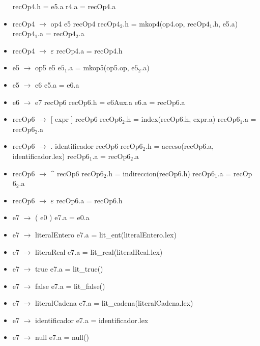 \documentclass[11pt]{article}
\begin{document}
\begin{itemize}
                \subitem recOp4.h = e5.a
                \subitem r4.a = recOp4.a
            \item recOp4 $\rightarrow$ op4 e5 recOp4
                \subitem recOp$4_2$.h = mkop4(op4.op, recOp$4_1$.h, e5.a)
                \subitem recOp$4_1$.a = recOp$4_2$.a
            \item recOp4 $\rightarrow$ $\varepsilon$
                \subitem recOp4.a = recOp4.h
            \item e5 $\rightarrow$ op5 e5
                \subitem e$5_1$.a = mkop5(op5.op, e$5_2$.a)
            \item e5 $\rightarrow$ e6
                \subitem e5.a = e6.a
            \item e6 $\rightarrow$ e7 recOp6
                \subitem recOp6.h = e6Aux.a
                \subitem e6.a = recOp6.a
            \item recOp6 $\rightarrow$ [ expr ] recOp6
                \subitem recOp$6_2$.h = index(recOp6.h, expr.a)
                \subitem recOp$6_1$.a = recOp$6_2$.a
            \item recOp6 $\rightarrow$ . identificador recOp6
                \subitem recOp$6_2$.h = acceso(recOp6.a, identificador.lex)
                \subitem recOp$6_1$.a = recOp$6_2$.a
            \item recOp6 $\rightarrow$ \^{} recOp6
                \subitem recOp$6_2$.h = indireccion(recOp6.h)
                \subitem recOp$6_1$.a = recOp$6_2$.a
            \item recOp6 $\rightarrow$ $\varepsilon$
                \subitem recOp6.a = recOp6.h
            \item e7 $\rightarrow$ ( e0 )
                \subitem e7.a = e0.a
            \item e7 $\rightarrow$ literalEntero
                \subitem e7.a = lit\_ent(literalEntero.lex)
            \item e7 $\rightarrow$ literaReal
                \subitem e7.a = lit\_real(literalReal.lex)
            \item e7 $\rightarrow$ true
                \subitem e7.a = lit\_true()
            \item e7 $\rightarrow$ false
                \subitem e7.a = lit\_false()
            \item e7 $\rightarrow$ literalCadena
                \subitem e7.a = lit\_cadena(literalCadena.lex)
            \item e7 $\rightarrow$ identificador
                \subitem e7.a = identificador.lex
            \item e7 $\rightarrow$ null
                \subitem e7.a = null()
        \end{itemize}
\end{document}

